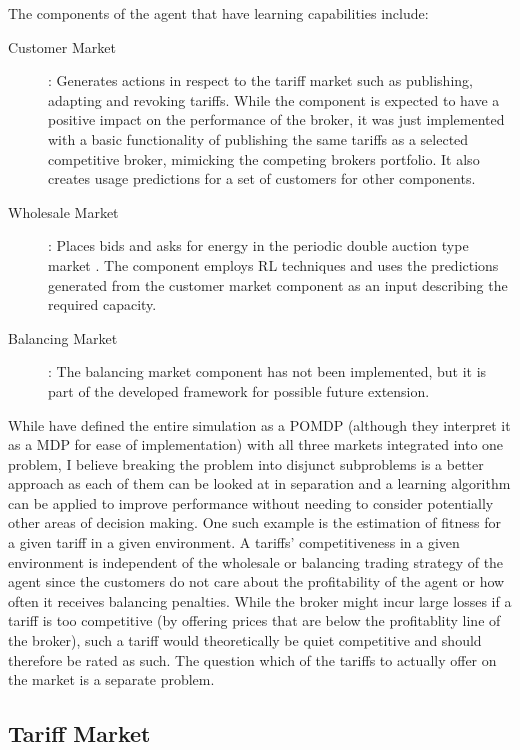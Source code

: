 The components of the agent that have learning capabilities include: 

\begin{description} 
	\item[Customer Market]: Generates actions in respect to the tariff market such as publishing,
	adapting and revoking tariffs. While the component is expected to have a positive impact on the performance of
	the broker, it was just implemented with a basic functionality of publishing the same tariffs as a selected
	competitive broker, mimicking the competing brokers portfolio. It also creates usage predictions for a set of
	customers for other components.  
	
	\item[Wholesale Market]: Places bids and asks for energy in the periodic double
	auction type market \citep{ketter2018powertac}. The component employs \ac {RL} techniques and uses the
	predictions generated from the customer market component as an input describing the required capacity.

	\item[Balancing Market]: The balancing market component has not been implemented, but it is part of the
	developed framework for possible future extension.  \end{description}

While \citep{tactexurieli2016mdp} have defined the entire simulation as a \ac {POMDP} (although they interpret it as a
\ac {MDP} for ease of implementation) with all three markets integrated into one problem, I believe breaking the problem
into disjunct subproblems is a better approach as each of them can be looked at in separation and a learning algorithm
can be applied to improve performance without needing to consider potentially other areas of decision making. One such
example is the estimation of fitness for a given tariff in a given environment. A tariffs' competitiveness in a given
environment is independent of the wholesale or balancing trading strategy of the agent since the customers do not care
about the profitability of the agent or how often it receives balancing penalties. While the broker might incur large
losses if a tariff is too competitive (by offering prices that are below the profitablity line of the broker), such a
tariff would theoretically be quiet competitive and should therefore be rated as such. The question which of the tariffs
to actually offer on the market is a separate problem.

\subsection{Tariff Market}

